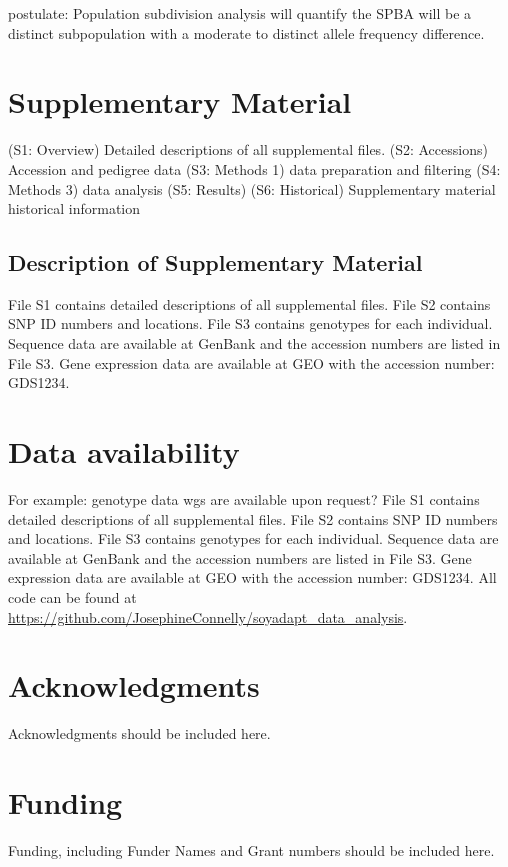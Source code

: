 \documentclass[9pt, onecolumn,twoside]{gsajnl}
\begin{document}
postulate: Population subdivision analysis will quantify the SPBA will be a distinct subpopulation with a moderate to distinct allele frequency difference.

\section{Supplementary Material}
\label{sec:supplementary:material}

(S1: Overview) Detailed descriptions of all supplemental files. 
(S2: Accessions) Accession and pedigree data 
(S3: Methods 1) data preparation and filtering 
(S4: Methods 3) data analysis
(S5: Results)
(S6: Historical) Supplementary material historical information 

\subsection{Description of Supplementary Material}
File S1 contains detailed descriptions of all supplemental files. 
File S2 contains SNP ID numbers and locations. File S3 contains genotypes for each individual. Sequence data are available at GenBank and the accession numbers are listed in File S3. Gene expression data are available at GEO with the accession number: GDS1234. 

\section{Data availability}
\label{sec:data:availability}
For example: genotype data wgs are available upon request? 
File S1 contains detailed descriptions of all supplemental files. File S2 contains SNP ID numbers and locations. File S3 contains genotypes for each individual. Sequence data are available at GenBank and the accession numbers are listed in File S3. Gene expression data are available at GEO with the accession number: GDS1234. 
All code can be found at \url{https://github.com/JosephineConnelly/soyadapt_data_analysis}.

\section{Acknowledgments}
Acknowledgments should be included here.

\section{Funding}
Funding, including Funder Names and Grant numbers should be included here.
\end{document}
